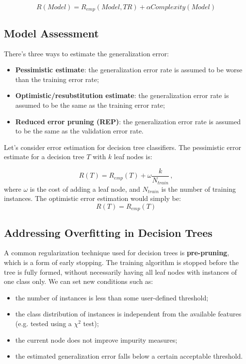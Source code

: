 \begin{equation*}
    R(\textit{Model}) = R_{emp}(\textit{Model}, \textit{TR}) + \alpha \textit{Complexity}(\textit{Model})
\end{equation*}

\subsection{Model Assessment}

There's three ways to estimate the generalization error:
\begin{itemize}
    \item \textbf{Pessimistic estimate}: the generalization error rate is assumed to be worse than the training error rate;
    \item \textbf{Optimistic/resubstitution estimate}: the generalization error rate is assumed to be the same as the training error rate;
    \item \textbf{Reduced error pruning (REP)}: the generalization error rate is assumed to be the same as the validation error rate.
\end{itemize}

Let's consider error estimation for decision tree classifiers. The pessimistic error estimate for a decision tree $T$ with $k$ leaf nodes is:

\begin{equation*}
    R(T) = R_{emp}(T) + \omega \dfrac{k}{N_{train}} \,,
\end{equation*}
where $\omega$ is the cost of adding a leaf node, and $N_{train}$ is the number of training instances. The optimistic error estimation would simply be:
\begin{equation*}
    R(T) = R_{emp}(T)
\end{equation*}

\subsection{Addressing Overfitting in Decision Trees}

A common regularization technique used for decision trees is \textbf{pre-pruning}, which is a form of early stopping. The training algorithm is stopped before the tree is fully formed, without necessarily having all leaf nodes with instances of one class only. We can set new conditions such as:
\begin{itemize}
    \item the number of instances is less than some user-defined threshold;
    \item the class distribution of instances is independent from the available features (e.g. tested using a $\chi^2$ test);
    \item the current node does not improve impurity measures;
    \item the estimated generalization error falls below a certain acceptable threshold.
\end{itemize}

